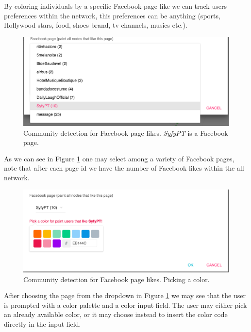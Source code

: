 By coloring individuals by a specific Facebook page like we can track users preferences within the network, this preferences can be anything (sports, Hollywood stars, food, shoes brand, tv channels, musics etc.).

\begin{figure}[h!]
\begin{center}
  \hspace*{-0.8in}
  \includegraphics[width=1.2\textwidth]{img/socii/socii_9.png}
\end{center}
\caption{\label{img:socii_10} Community detection for Facebook page likes. \textit{SyfyPT} is a Facebook page.}
\end{figure}

As we can see in Figure \ref{img:socii_10} one may select among a variety of Facebook pages, note that after each page id we have the number of Facebook likes within the all network.

\begin{figure}[h!]
\begin{center}
  \hspace*{-0.8in}
  \includegraphics[width=1.2\textwidth]{img/socii/socii_10.png}
\end{center}
\caption{\label{img:socii_11} Community detection for Facebook page likes. Picking a color.}
\end{figure}

\indent After choosing the page from the dropdown in Figure \ref{img:socii_10} we may see that the user is prompted with a color palette and a color input field. The user may either pick an already available color, or it may choose instead to insert the color code directly in the input field.

